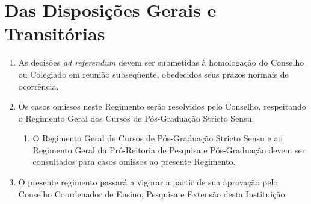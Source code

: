 \documentclass{article}
\newcommand{\singleitem}{\item[Parágrafo Único.]}
\newcommand{\grupoMenor}{Colegiado\xspace}
\newcommand{\grupoMaior}{Conselho\xspace}
\begin{document}
\section{Das Disposições Gerais e Transitórias}

\begin{enumerate}
	\item As decisões \textit{ad referendum} devem ser submetidas à homologação do \grupoMaior ou \grupoMenor em reunião subseqüente, obedecidos seus prazos normais de ocorrência.

	\item Os casos omissos neste Regimento serão resolvidos pelo \grupoMaior, respeitando o Regimento Geral dos Cursos de Pós-Graduação Stricto Sensu.
	\begin{enumerate}
		\singleitem O Regimento Geral de Cursos de Pós-Graduação Stricto Sensu e ao Regimento Geral da Pró-Reitoria de Pesquisa e Pós-Graduação devem ser consultados para casos omissos ao presente Regimento. 
	\end{enumerate}

	\item  O presente regimento passará a vigorar a partir de sua aprovação pelo Conselho Coordenador de Ensino, Pesquisa e Extensão desta Instituição.

\end{enumerate}
\end{document}
